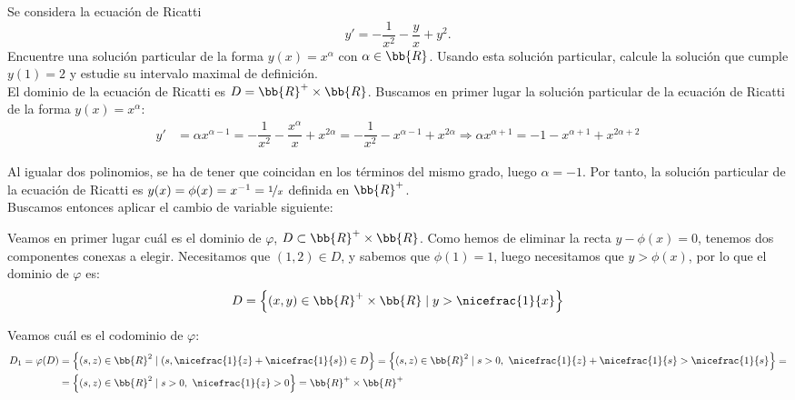\begin{ejercicio}
    Se considera la ecuación de Ricatti
    \begin{equation*}
        y' = -\dfrac{1}{x^2} - \dfrac{y}{x} + y^2.
    \end{equation*}
    Encuentre una solución particular de la forma $y(x) = x^\alpha$ con $\alpha \in \bb{R}$. Usando esta solución particular, calcule la solución que cumple $y(1) = 2$ y estudie su intervalo maximal de definición.\\

    El dominio de la ecuación de Ricatti es $D=\bb{R}^+\times \bb{R}$. Buscamos en primer lugar la solución particular de la ecuación de Ricatti de la forma $y(x) = x^\alpha$:
    \begin{align*}
        y' &= \alpha x^{\alpha-1} = -\dfrac{1}{x^2} - \dfrac{x^\alpha}{x} + x^{2\alpha} = -\dfrac{1}{x^2} - x^{\alpha-1} + x^{2\alpha}
        \Longrightarrow
        \alpha x^{\alpha+1} = -1 - x^{\alpha+1} + x^{2\alpha+2}
    \end{align*}

    Al igualar dos polinomios, se ha de tener que coincidan en los términos del mismo grado, luego $\alpha=-1$. Por tanto, la solución particular de la ecuación de Ricatti es $y(x)=\phi(x) = x^{-1} = \nicefrac{1}{x}$ definida en $\bb{R}^+$.\\

    Buscamos entonces aplicar el cambio de variable siguiente:

    Veamos en primer lugar cuál es el dominio de $\varphi$, $D\subset \bb{R}^+\times \bb{R}$. Como hemos de eliminar la recta $y-\phi(x)=0$, tenemos dos componentes conexas a elegir. Necesitamos que $(1,2)\in D$, y sabemos que $\phi(1)=1$, luego necesitamos que $y>\phi(x)$, por lo que el dominio de $\varphi$ es:
    \begin{equation*}
        D = \left\{(x,y)\in \bb{R}^+\times \bb{R} \mid y>\nicefrac{1}{x}\right\}
    \end{equation*}

    Veamos cuál es el codominio de $\varphi$:
    \begin{align*}
        D_1=\varphi(D) &= \left\{(s,z)\in \bb{R}^2 \mid (s, \nicefrac{1}{z}+\nicefrac{1}{s})\in D\right\} = \left\{(s,z)\in \bb{R}^2 \mid s>0,~\nicefrac{1}{z}+\nicefrac{1}{s} > \nicefrac{1}{s} \right\}
        =\\&= \left\{(s,z)\in \bb{R}^2 \mid s>0,~\nicefrac{1}{z}>0 \right\}
        = \bb{R}^+\times \bb{R}^+
    \end{align*}


\end{ejercicio}
